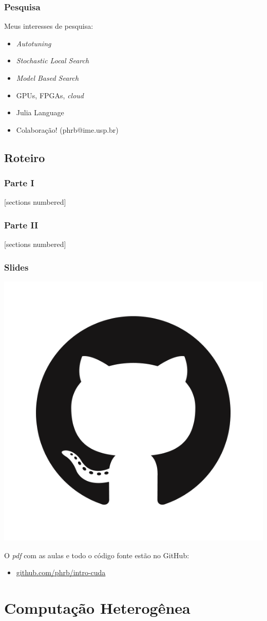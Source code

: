 \documentclass[10pt, compress]{beamer}
\begin{document}
\begin{frame}
    \frametitle{Pesquisa}
    Meus interesses de \alert{pesquisa}:
    \begin{itemize}
        \item \textit{Autotuning}
        \item \textit{Stochastic Local Search}
        \item \textit{Model Based Search}
            \pause
        \item GPUs, FPGAs, \textit{cloud}
        \item Julia Language
            \pause
        \item Colaboração! (\alert{phrb@ime.usp.br})
    \end{itemize}
\end{frame}

\subsection{Roteiro}

\begin{frame}
    \frametitle{Parte I}
    [sections numbered]
    \tableofcontents[hideallsubsections, part=1]
\end{frame}

\begin{frame}
    \frametitle{Parte II}
    [sections numbered]
    \tableofcontents[hideallsubsections, part=2]
\end{frame}

\begin{frame}
    \frametitle{Slides}
    \begin{center}
        \includegraphics[width=.18\textwidth]{github}
    \end{center}
    O \emph{pdf} com as aulas e todo o código fonte estão no \alert{GitHub}:

    \begin{itemize}
        \item \url{github.com/phrb/intro-cuda}
    \end{itemize}
\end{frame}


\section{Computação Heterogênea}
\end{document}

